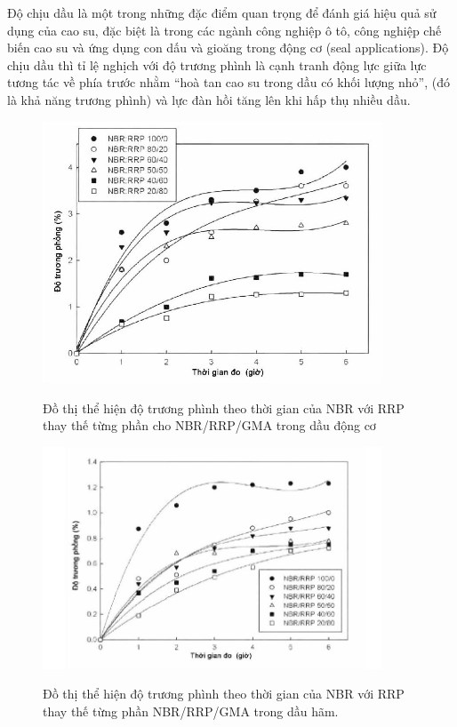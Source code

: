 \documentclass[12pt,a4paper]{article}
\begin{document}
	Độ chịu dầu là một trong những đặc điểm quan trọng để đánh giá hiệu quả sử dụng của cao su, đặc biệt là trong các ngành công nghiệp ô tô, công nghiệp chế biến cao su và ứng dụng con dấu và gioăng trong động cơ (seal applications). Độ chịu dầu thì tỉ lệ nghịch với độ trương phình là cạnh tranh động lực giữa lực tương tác về phía trước nhằm “hoà tan cao su trong dầu có khối lượng nhỏ”, (đó là khả năng trương phình) và lực đàn hồi tăng lên khi hấp thụ nhiều dầu.
		\begin{figure}
			\centering
			\includegraphics[width=0.9\textwidth]{10.JPG}
			\label{fig:HINH_8}
			\caption{Đồ thị thể hiện độ trương phình theo thời gian của NBR với RRP thay thế từng phần cho
NBR/RRP/GMA trong dầu động cơ}
		\end{figure}
		
		\begin{figure}
			\centering
			\includegraphics[width=0.9\textwidth]{11.JPG}
			\label{fig:HINH_9}
			\caption{Đồ thị thể hiện độ trương phình theo thời gian của NBR với RRP thay thế từng phần NBR/RRP/GMA trong dầu hãm.}
		\end{figure}
		
\end{document}
